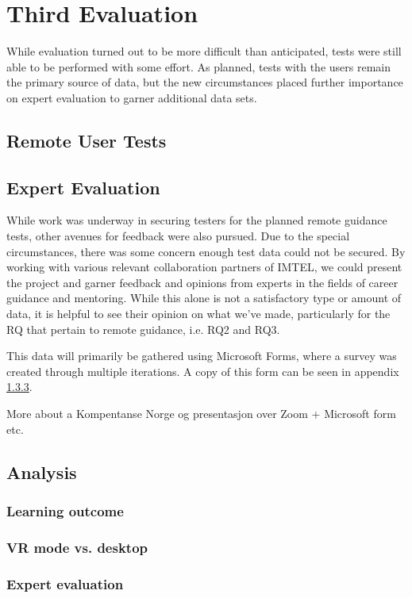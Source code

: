 \section{Third Evaluation}
While evaluation turned out to be more difficult than anticipated, tests were still able to be performed with some effort. As planned, tests with the  users remain the primary source of data, but the new circumstances placed further importance on expert evaluation to garner additional data sets.

\subsection{Remote User Tests}



\subsection{Expert Evaluation}
While work was underway in securing testers for the planned remote guidance tests, other avenues for feedback were also pursued. Due to the special circumstances, there was some concern enough test data could not be secured. By working with various relevant collaboration partners of IMTEL, we could present the project and garner feedback and opinions from experts in the fields of career guidance and mentoring. While this alone is not a satisfactory type or amount of data, it is helpful to see their opinion on what we've made, particularly for the RQ that pertain to remote guidance, i.e. RQ2 and RQ3.

This data will primarily be gathered using Microsoft Forms, where a survey was created through multiple iterations. A copy of this form can be seen in appendix \ref{}. 


More about a Kompentanse Norge og presentasjon over Zoom + Microsoft form etc. 







\subsection{Analysis}

\subsubsection{Learning outcome}

\subsubsection{VR mode vs. desktop}

\subsubsection{Expert evaluation}


\cleardoublepage